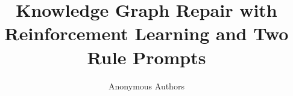 \documentclass[journal]{IEEEtran}
\begin{document}
\title{Knowledge Graph Repair with Reinforcement Learning and Two Rule Prompts}

\author{Anonymous Authors}

\maketitle

















\end{document}
